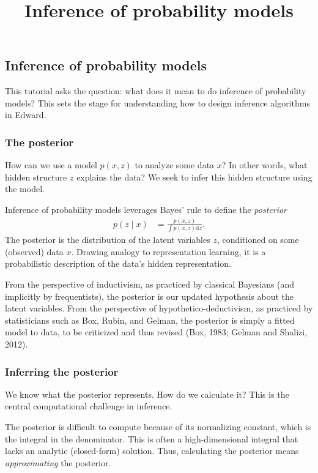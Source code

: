 \title{Inference of probability models}

\subsection{Inference of probability models}

This tutorial asks the question: what does it mean to do inference of
probability models? This sets the stage for understanding how to
design inference algorithms in Edward.

\subsubsection{The posterior}

How can we use a model $p(x,z)$ to analyze some data $x$? In other words,
what hidden structure $z$ explains the data? We seek to infer this
hidden structure using the model.

Inference of probability models leverages Bayes' rule to define the
\emph{posterior}
\begin{align*}
  p(z \mid x)
  &=
  \frac{p(x,z)}{\int p(x,z) \text{d}z}.
\end{align*}
The posterior is the distribution of the latent variables $z$, conditioned on
some (observed) data $x$.
Drawing analogy to representation learning, it is a probabilistic
description of the data's hidden representation.

From the perspective of inductivism, as practiced by classical
Bayesians (and implicitly by frequentists),
the posterior is our updated hypothesis about the latent variables.
From the perspective of hypothetico-deductivism, as practiced by
statisticians such as Box, Rubin, and Gelman, the posterior is simply
a fitted model to data, to be criticized and thus revised (Box, 1983;
Gelman and Shalizi, 2012).



\subsubsection{Inferring the posterior}

We know what the posterior represents. How do we calculate it? This is the
central computational challenge in inference.

The posterior is difficult to compute because of its normalizing
constant, which is the integral in the denominator.
This is often a high-dimensional integral that lacks an analytic (closed-form)
solution. Thus, calculating the posterior means \emph{approximating} the
posterior.

